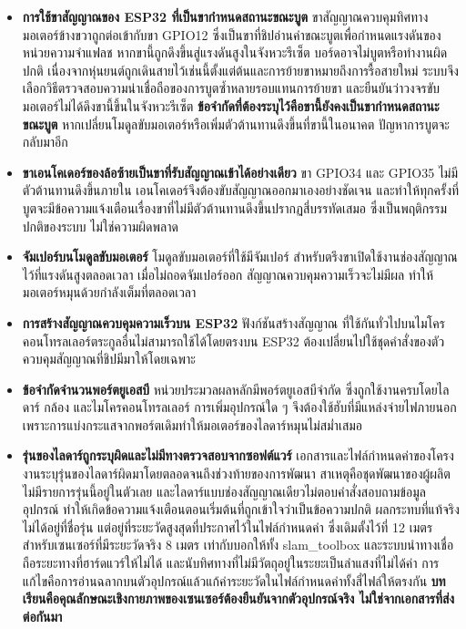 \documentclass[a4paper,12pt]{report}
\begin{document}
\begin{itemize}[leftmargin=1.25cm, itemsep=6pt, topsep=6pt]
    \item \textbf{การใช้ขาสัญญาณของ ESP32 ที่เป็นขากำหนดสถานะขณะบูต}
    ขาสัญญาณควบคุมทิศทางมอเตอร์ข้างขวาถูกต่อเข้ากับขา GPIO12
    ซึ่งเป็นขาที่ชิปอ่านค่าขณะบูตเพื่อกำหนดแรงดันของหน่วยความจำแฟลช
    หากขานี้ถูกดึงขึ้นสู่แรงดันสูงในจังหวะรีเซ็ต บอร์ดอาจไม่บูตหรือทำงานผิดปกติ
    เนื่องจากหุ่นยนต์ถูกเดินสายไว้เช่นนี้ตั้งแต่ต้นและการย้ายขาหมายถึงการรื้อสายใหม่
    ระบบจึงเลือกวิธีตรวจสอบความน่าเชื่อถือของการบูตซ้ำหลายรอบแทนการย้ายขา
    และยืนยันว่าวงจรขับมอเตอร์ไม่ได้ดึงขานี้ขึ้นในจังหวะรีเซ็ต
    \textbf{ข้อจำกัดที่ต้องระบุไว้คือขานี้ยังคงเป็นขากำหนดสถานะขณะบูต}
    หากเปลี่ยนโมดูลขับมอเตอร์หรือเพิ่มตัวต้านทานดึงขึ้นที่ขานี้ในอนาคต
    ปัญหาการบูตจะกลับมาอีก

    \item \textbf{ขาเอนโคเดอร์ของล้อซ้ายเป็นขาที่รับสัญญาณเข้าได้อย่างเดียว}
    ขา GPIO34 และ GPIO35 ไม่มีตัวต้านทานดึงขึ้นภายใน
    เอนโคเดอร์จึงต้องขับสัญญาณออกมาเองอย่างชัดเจน
    และทำให้ทุกครั้งที่บูตจะมีข้อความแจ้งเตือนเรื่องขาที่ไม่มีตัวต้านทานดึงขึ้นปรากฏสี่บรรทัดเสมอ
    ซึ่งเป็นพฤติกรรมปกติของระบบ ไม่ใช่ความผิดพลาด

    \item \textbf{จัมเปอร์บนโมดูลขับมอเตอร์} โมดูลขับมอเตอร์ที่ใช้มีจัมเปอร์
    สำหรับตรึงขาเปิดใช้งานช่องสัญญาณไว้ที่แรงดันสูงตลอดเวลา
    เมื่อไม่ถอดจัมเปอร์ออก สัญญาณควบคุมความเร็วจะไม่มีผล
    ทำให้มอเตอร์หมุนด้วยกำลังเต็มที่ตลอดเวลา

    \item \textbf{การสร้างสัญญาณควบคุมความเร็วบน ESP32} ฟังก์ชันสร้างสัญญาณ
    ที่ใช้กันทั่วไปบนไมโครคอนโทรลเลอร์ตระกูลอื่นไม่สามารถใช้ได้โดยตรงบน ESP32
    ต้องเปลี่ยนไปใช้ชุดคำสั่งของตัวควบคุมสัญญาณที่ชิปมีมาให้โดยเฉพาะ

    \item \textbf{ข้อจำกัดจำนวนพอร์ตยูเอสบี} หน่วยประมวลผลหลักมีพอร์ตยูเอสบีจำกัด
    ซึ่งถูกใช้งานครบโดยไลดาร์ กล้อง และไมโครคอนโทรลเลอร์
    การเพิ่มอุปกรณ์ใด ๆ จึงต้องใช้ฮับที่มีแหล่งจ่ายไฟภายนอก
    เพราะการแบ่งกระแสจากพอร์ตเดิมทำให้มอเตอร์ของไลดาร์หมุนไม่สม่ำเสมอ

    \item \textbf{รุ่นของไลดาร์ถูกระบุผิดและไม่มีทางตรวจสอบจากซอฟต์แวร์}
    เอกสารและไฟล์กำหนดค่าของโครงงานระบุรุ่นของไลดาร์ผิดมาโดยตลอดจนถึงช่วงท้ายของการพัฒนา
    สาเหตุคือชุดพัฒนาของผู้ผลิตไม่มีรายการรุ่นนี้อยู่ในตัวเลย
    และไลดาร์แบบช่องสัญญาณเดียวไม่ตอบคำสั่งสอบถามข้อมูลอุปกรณ์
    ทำให้เกิดข้อความแจ้งเตือนตอนเริ่มต้นที่ถูกเข้าใจว่าเป็นข้อความปกติ
    ผลกระทบที่แท้จริงไม่ได้อยู่ที่ชื่อรุ่น แต่อยู่ที่ระยะวัดสูงสุดที่ประกาศไว้ในไฟล์กำหนดค่า
    ซึ่งเดิมตั้งไว้ที่ 12 เมตรสำหรับเซนเซอร์ที่มีระยะวัดจริง 8 เมตร
    เท่ากับบอกให้ทั้ง slam\_toolbox และระบบนำทางเชื่อถือระยะทางที่ฮาร์ดแวร์ให้ไม่ได้
    และนับทิศทางที่ไม่มีวัตถุอยู่ในระยะเป็นลำแสงที่ไม่ได้ค่า
    การแก้ไขคือการอ่านฉลากบนตัวอุปกรณ์แล้วแก้ค่าระยะวัดในไฟล์กำหนดค่าทั้งสี่ไฟล์ให้ตรงกัน
    \textbf{บทเรียนคือคุณลักษณะเชิงกายภาพของเซนเซอร์ต้องยืนยันจากตัวอุปกรณ์จริง
    ไม่ใช่จากเอกสารที่ส่งต่อกันมา}


\end{itemize}
\end{document}
